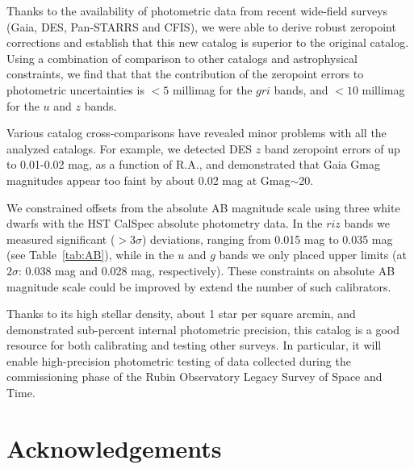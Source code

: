 \documentclass[fleqn,usenatbib]{mnras}
\begin{document}
Thanks to the availability of photometric data from recent wide-field surveys (Gaia, DES, Pan-STARRS
and CFIS), we were able to derive robust zeropoint corrections and establish that this new catalog
is superior to the original catalog. Using a combination of comparison to other catalogs and 
astrophysical constraints, we find that that the contribution of the zeropoint errors to photometric
uncertainties is $<5$ millimag for the $gri$ bands, and $<10$ millimag for the $u$ and $z$ bands. 

Various catalog cross-comparisons have revealed minor problems with all the analyzed catalogs.
For example, we detected DES $z$ band zeropoint errors of up to 0.01-0.02 mag, as a function 
of R.A., and demonstrated that Gaia Gmag magnitudes appear too faint by about 0.02 mag at
Gmag$\sim$20.
 
We constrained offsets from the absolute AB magnitude scale using three white dwarfs with the 
HST CalSpec absolute photometry data. In the $riz$ bands we measured significant ($>3\sigma$) 
deviations, ranging from 0.015 mag to 0.035 mag (see Table~\ref{tab:AB}), while in the $u$ and $g$ 
bands we only placed upper limits (at $2\sigma$: 0.038 mag and 0.028 mag, respectively). These
constraints on absolute AB magnitude scale could be improved by extend the number of such 
calibrators.

Thanks to its high stellar density, about 1 star per square arcmin, and demonstrated sub-percent 
internal photometric precision, this catalog is a good resource for both calibrating and testing 
other surveys. In particular, it will enable high-precision photometric testing of data collected 
during the commissioning phase of the Rubin Observatory Legacy Survey of Space and Time. 

\newpage

\section*{Acknowledgements}
\end{document}
